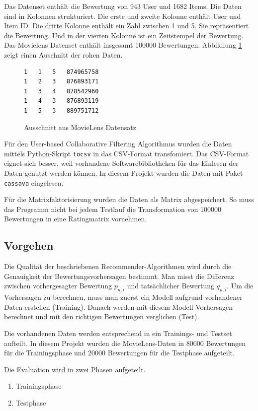 \documentclass[a4paper, 12pt]{article}
\begin{document}
Das Datenset enthält die Bewertung von 943 User und 1682 Items. Die Daten sind in Kolonnen strukturiert. Die erste und zweite Kolonne enthält User und Item ID. Die dritte Kolonne enthält ein Zahl zwischen 1 und 5. Sie repräsentiert die Bewertung. Und in der vierten Kolonne ist ein Zeitstempel der Bewertung. Das Movielens Datenset enthält insgesamt 100000 Bewertungen. Abbildlung \ref{fig:movielens} zeigt einen Auschnitt der rohen Daten.

\begin{figure}
\centering
\begin{verbatim}
1	1	5	874965758
1	2	3	876893171
1	3	4	878542960
1	4	3	876893119
1	5	3	889751712
\end{verbatim}
\caption{Ausschnitt aus MovieLens Datensatz}
\label{fig:movielens}
\end{figure}

Für den User-based Collaborative Filtering Algorithmus wurden die Daten mittels Python-Skript \verb|tocsv| in das CSV-Format transfomiert. Das CSV-Format eignet sich besser, weil vorhandene Softwarebibliotheken für das Einlesen der Daten genutzt werden können. In diesem Projekt wurden die Daten mit Paket \verb|cassava| eingelesen.

Für die Matrixfaktorisierung wurden die Daten als Matrix abgespeichert. So muss das Programm nicht bei jedem Testlauf die Transformation von 100000 Bewertungen in eine Ratingmatrix vornehmen.

\subsection{Vorgehen}
\label{sec:procedure}

Die Qualität der beschriebenen Recommender-Algorithmen wird durch die Genauigkeit der Bewertungsvorhersagen bestimmt. Man misst die Differenz zwischen vorhergesagter Bewertung $p_{u,i}$ und tatsächlicher Bewertung $q_{u,i}$. 
Um die Vorhersagen zu berechnen, muss man zuerst ein Modell aufgrund vorhandener Daten erstellen (Training). Danach werden mit diesem Modell Vorhersagen berechnet und mit den richtigen Bewertungen verglichen (Test). 

Die vorhandenen Daten werden entsprechend in ein Trainings- und Testset aufteilt. In diesem Projekt wurden die MovieLens-Daten in 80000 Bewertungen für die Trainingsphase und 20000 Bewertungen für die Testphase aufgeteilt.

Die Evaluation wird in zwei Phasen aufgeteilt. 

\begin{enumerate}
\item Trainingsphase
\item Testphase
\end{enumerate}
\end{document}
